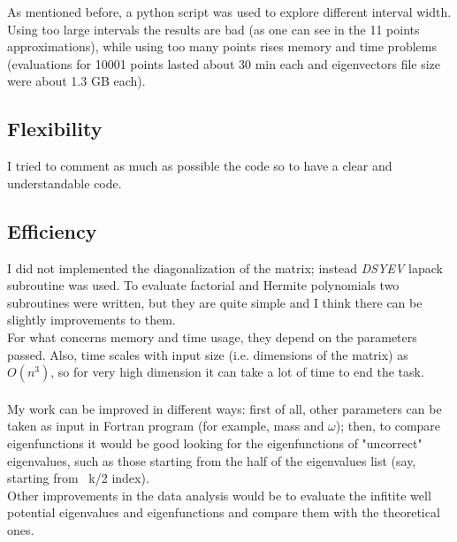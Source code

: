 \documentclass[12pt, a4paper, notitlepage]{report}
\begin{document}
As mentioned before, a python script was used to explore different interval width. Using too large intervals the results are bad (as one can see in the 11 points approximations), while using too many points rises memory and time problems (evaluations for 10001 points lasted about 30 min each and eigenvectors file size were about 1.3 GB each).

\subsection*{Flexibility}

I tried to comment as much as possible the code so to have a clear and understandable code.

\subsection*{Efficiency}

I did not implemented the diagonalization of the matrix; instead  \textit{DSYEV} lapack subroutine was used. To evaluate factorial and Hermite polynomials two subroutines were written, but they are quite simple and I think there can be slightly improvements to them.\\
For what concerns memory and time usage, they depend on the parameters passed. Also, time scales with input size (i.e. dimensions of the matrix) as ~$O(n^3)$, so for very high dimension it can take a lot of time to end the task. \\ \\

My work can be improved in different ways: first of all, other parameters can be taken as input in Fortran program (for example, mass and $\omega$); then, to compare eigenfunctions it would be good looking for the eigenfunctions of "uncorrect" eigenvalues, such as those starting from the half of the eigenvalues list (say, starting from ~k/2 index).\\
Other improvements in the data analysis would be to evaluate the infitite well potential eigenvalues and eigenfunctions and compare them with the theoretical ones.
\end{document}
